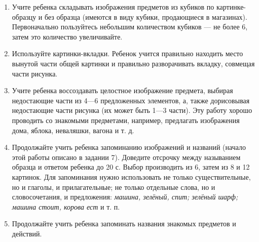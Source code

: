 \documentclass[a5paper]{book}
\renewcommand{\emph}[1]{\textit{#1}}
\begin{document}
\begin{enumerate}
\def\labelenumi{\arabic{enumi}.}
\setcounter{enumi}{1}
\item
  
  Учите ребенка складывать изображения предметов из кубиков по
  картинке-образцу и без образца (имеются в виду кубики, продающиеся в
  магазинах). Первоначально пользуйтесь небольшим количеством кубиков
  --- не более 6, затем это количество увеличивайте.
  
\item
  
  Используйте картинки-вкладки. Ребенок учится правильно находить место
  вынутой части общей картинки и правильно разворачивать вкладку,
  совмещая части рисунка.
  
\item
  
  Учите ребенка воссоздавать целостное изображение предмета, выбирая
  недостающие части из 4---6 предложенных элементов, а, также
  дорисовывая недостающие части рисунка (их может быть 1---3 части). Эту
  работу хорошо проводить со знакомыми предметами, например, предлагать
  изображения дома, яблока, неваляшки, вагона и т. д.
  
\item
  
  Продолжайте учить ребенка запоминанию изображений и названий (начало
  этой работы описано в задании 7). Доведите отсрочку между называнием
  образца и ответом ребенка до 20 с. Выбор производить из 6, затем из 8
  и 12 картинок. Для запоминания нужно использовать не только
  существительные, но и глаголы, и прилагательные; не только отдельные
  слова, но и словосочетания, и предложения: \emph{машина, зелёный,
  спит; зелёный шарф; машина стоит, корова ест} и т. п.
  
\item
  
  Продолжайте учить ребенка запоминать названия знакомых предметов и
  действий.
  
\end{enumerate}
\end{document}

